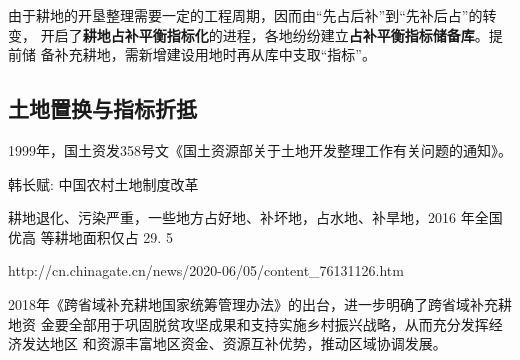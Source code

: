 
由于耕地的开垦整理需要一定的工程周期，因而由“先占后补”到“先补后占”的转变，
开启了\textbf{耕地占补平衡指标化}的进程，各地纷纷建立\textbf{占补平衡指标储备库}。提前储
备补充耕地，需新增建设用地时再从库中支取“指标”。



\subsection{土地置换与指标折抵}

1999年，国土资发358号文《国土资源部关于土地开发整理工作有关问题的通知》。

韩长赋: 中国农村土地制度改革

耕地退化、污染严重，一些地方占好地、补坏地，占水地、补旱地，2016 年全国优高
等耕地面积仅占 29. 5%


http://cn.chinagate.cn/news/2020-06/05/content_76131126.htm

2018年《跨省域补充耕地国家统筹管理办法》的出台，进一步明确了跨省域补充耕地资
金要全部用于巩固脱贫攻坚成果和支持实施乡村振兴战略，从而充分发挥经济发达地区
和资源丰富地区资金、资源互补优势，推动区域协调发展。

